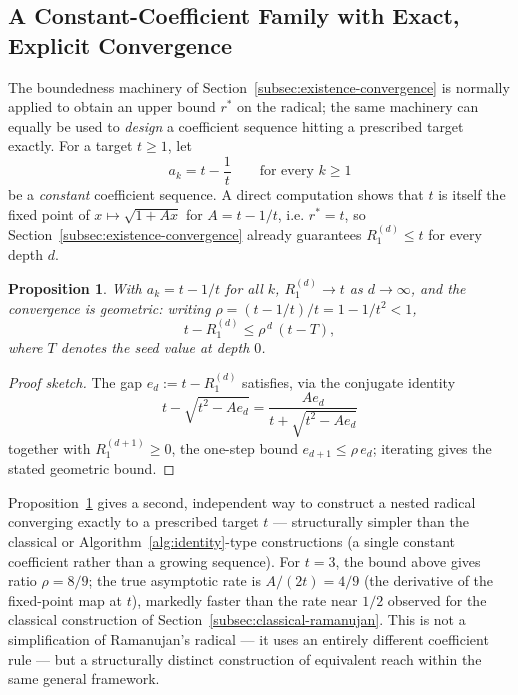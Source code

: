\documentclass[11pt,a4paper]{amsart}
\theoremstyle{plain}
\newtheorem{proposition}[theorem]{Proposition}
\theoremstyle{definition}
\theoremstyle{remark}
\begin{document}
\subsection{A Constant-Coefficient Family with Exact, Explicit Convergence}
\label{subsec:target-radical}

The boundedness machinery of Section~\ref{subsec:existence-convergence} is normally applied to obtain an upper bound $r^\ast$ on the radical; the same machinery can equally be used to \emph{design} a coefficient sequence hitting a prescribed target exactly. For a target $t \ge 1$, let
\[
a_k = t - \frac{1}{t} \qquad \text{for every } k \ge 1
\]
be a \emph{constant} coefficient sequence. A direct computation shows that $t$ is itself the fixed point of $x \mapsto \sqrt{1+Ax}$ for $A = t-1/t$, i.e. $r^\ast = t$, so Section~\ref{subsec:existence-convergence} already guarantees $R_1^{(d)} \le t$ for every depth $d$.

\begin{proposition}
\label{prop:target-radical}
With $a_k = t - 1/t$ for all $k$, $R_1^{(d)} \to t$ as $d \to \infty$, and the convergence is geometric: writing $\rho = (t-1/t)/t = 1 - 1/t^2 < 1$,
\[
t - R_1^{(d)} \le \rho^{\,d}\,(t - T),
\]
where $T$ denotes the seed value at depth $0$.
\end{proposition}

\begin{proof}[Proof sketch]
The gap $e_d := t - R_1^{(d)}$ satisfies, via the conjugate identity
\[
t - \sqrt{t^2 - A e_d} = \frac{A e_d}{t + \sqrt{t^2 - Ae_d}}
\]
together with $R_1^{(d+1)} \ge 0$, the one-step bound $e_{d+1} \le \rho\, e_d$; iterating gives the stated geometric bound. \qedhere
\end{proof}

Proposition~\ref{prop:target-radical} gives a second, independent way to construct a nested radical converging exactly to a prescribed target $t$ — structurally simpler than the classical or Algorithm~\ref{alg:identity}-type constructions (a single constant coefficient rather than a growing sequence). For $t=3$, the bound above gives ratio $\rho = 8/9$; the true asymptotic rate is $A/(2t) = 4/9$ (the derivative of the fixed-point map at $t$), markedly faster than the rate near $1/2$ observed for the classical construction of Section~\ref{subsec:classical-ramanujan}. This is not a simplification of Ramanujan's radical — it uses an entirely different coefficient rule — but a structurally distinct construction of equivalent reach within the same general framework.
\end{document}
